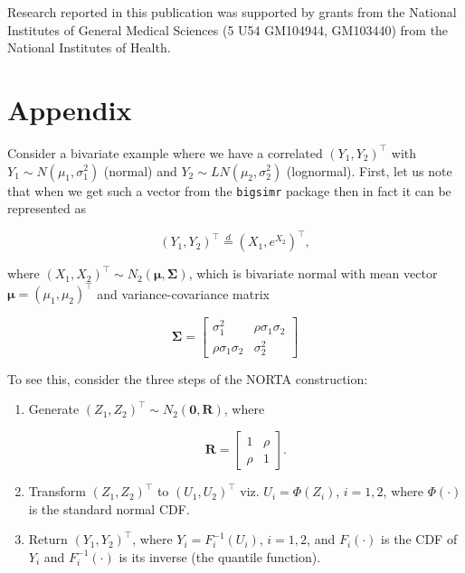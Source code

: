 \documentclass[
]{jss}
\begin{document}
Research reported in this publication was supported by grants from the
National Institutes of General Medical Sciences (5 U54 GM104944,
GM103440) from the National Institutes of Health.

\newpage

\hypertarget{appendix}{%
\section*{Appendix}\label{appendix}}

\noindent Consider a bivariate example where we have a correlated
\((Y_1, Y_2)^\top\) with \(Y_1\sim N(\mu_1, \sigma_1^2)\) (normal) and
\(Y_2\sim LN(\mu_2, \sigma_2^2)\) (lognormal). First, let us note that
when we get such a vector from the \texttt{bigsimr} package then in fact
it can be represented as

\begin{equation}
\label{eq:kram1}
(Y_1, Y_2)^\top \stackrel{d}{=} \left(X_1, e^{X_2}\right)^\top,
\end{equation}

where \((X_1, X_2)^\top \sim N_2(\boldsymbol \mu, \boldsymbol \Sigma)\),
which is bivariate normal with mean vector
\(\boldsymbol \mu = (\mu_1, \mu_2)^\top\) and variance-covariance matrix

\begin{equation}
\label{eq:kram2}
\boldsymbol \Sigma = 
\begin{bmatrix}
\sigma_1^2 & \rho \sigma_1\sigma_2\\
\rho \sigma_1\sigma_2 & \sigma_2^2
\end{bmatrix}
\end{equation}

To see this, consider the three steps of the NORTA construction:

\begin{enumerate}

\item Generate $(Z_1, Z_2)^\top \sim N_2(\boldsymbol 0, \boldsymbol R)$, where 

\begin{equation}
\label{eq:kram3}
\boldsymbol R = 
\left[
\begin{array}{cc}
1 & \rho \\
\rho & 1
\end{array}
\right].
\end{equation}


\item Transform $(Z_1, Z_2)^\top$ to $(U_1, U_2)^\top$ viz. $U_i =\Phi(Z_i)$,  $i=1,2$, where $\Phi(\cdot)$ is the standard normal CDF. 

\item Return $(Y_1, Y_2)^\top$, where $Y_i=F_i^{-1}(U_i)$, $i=1,2$, and $F_i(\cdot)$ is the CDF of $Y_i$ and $F_i^{-1}(\cdot)$ is its inverse (the quantile function). 

\end{enumerate}
\end{document}
